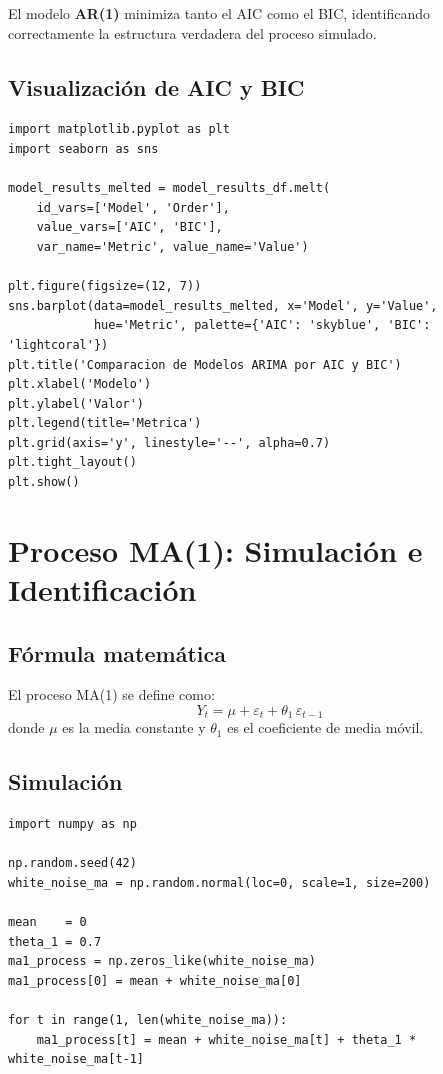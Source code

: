 \documentclass[12pt, a4paper]{article}
\begin{document}
El modelo \textbf{AR(1)} minimiza tanto el AIC como el BIC, identificando
correctamente la estructura verdadera del proceso simulado.

\subsection{Visualización de AIC y BIC}

\begin{lstlisting}
import matplotlib.pyplot as plt
import seaborn as sns

model_results_melted = model_results_df.melt(
    id_vars=['Model', 'Order'],
    value_vars=['AIC', 'BIC'],
    var_name='Metric', value_name='Value')

plt.figure(figsize=(12, 7))
sns.barplot(data=model_results_melted, x='Model', y='Value',
            hue='Metric', palette={'AIC': 'skyblue', 'BIC': 'lightcoral'})
plt.title('Comparacion de Modelos ARIMA por AIC y BIC')
plt.xlabel('Modelo')
plt.ylabel('Valor')
plt.legend(title='Metrica')
plt.grid(axis='y', linestyle='--', alpha=0.7)
plt.tight_layout()
plt.show()
\end{lstlisting}

\section{Proceso MA(1): Simulación e Identificación}

\subsection{Fórmula matemática}

El proceso MA(1) se define como:
\[
  Y_t = \mu + \varepsilon_t + \theta_1\,\varepsilon_{t-1}
\]
donde $\mu$ es la media constante y $\theta_1$ es el coeficiente de media móvil.

\subsection{Simulación}

\begin{lstlisting}
import numpy as np

np.random.seed(42)
white_noise_ma = np.random.normal(loc=0, scale=1, size=200)

mean    = 0
theta_1 = 0.7
ma1_process = np.zeros_like(white_noise_ma)
ma1_process[0] = mean + white_noise_ma[0]

for t in range(1, len(white_noise_ma)):
    ma1_process[t] = mean + white_noise_ma[t] + theta_1 * white_noise_ma[t-1]
\end{lstlisting}
\end{document}

